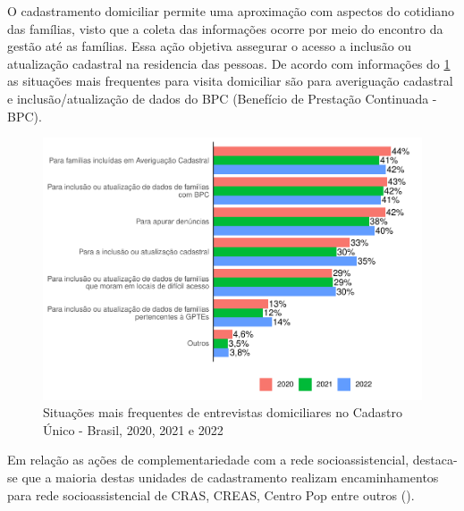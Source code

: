 \documentclass[
  brazilian]{report}
\begin{document}
O cadastramento domiciliar permite uma aproximação com aspectos do
cotidiano das famílias, visto que a coleta das informações ocorre por
meio do encontro da gestão até as famílias. Essa ação objetiva assegurar
o acesso a inclusão ou atualização cadastral na residencia das pessoas.
De acordo com informações do \cref{fig:visit_dom} as situações mais
frequentes para visita domiciliar são para averiguação cadastral e
inclusão/atualização de dados do BPC (Benefício de Prestação Continuada
- BPC).

\begin{figure}
\includegraphics{Censo-SUAS-2022_files/figure-latex/visit_dom-1} \caption[Situações mais frequentes de entrevistas domiciliares no Cadastro Único - Brasil, 2020, 2021 e 2022]{Situações mais frequentes de entrevistas domiciliares no Cadastro Único - Brasil, 2020, 2021 e 2022}\label{fig:visit_dom}
\end{figure}

Em relação as ações de complementariedade com a rede socioassistencial,
destaca-se que a maioria destas unidades de cadastramento realizam
encaminhamentos para rede socioassistencial de CRAS, CREAS, Centro Pop
entre outros ().
\end{document}
